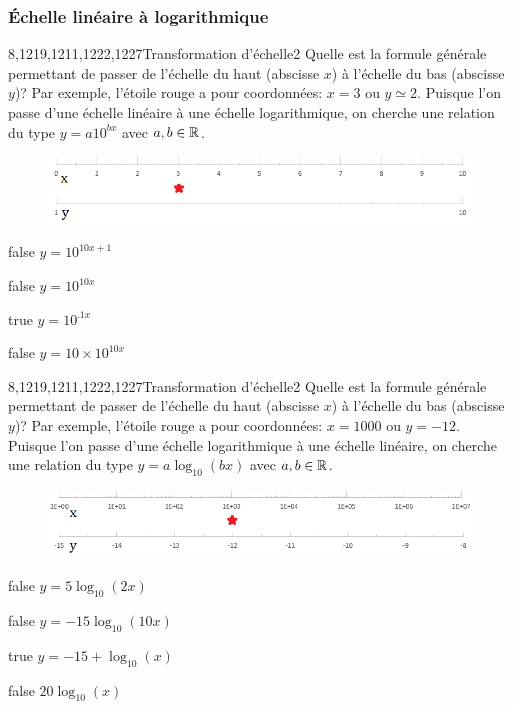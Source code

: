         \subsubsection{Échelle linéaire à logarithmique}
			\begin{question}{8,1219,1211,1222,1227}{Transformation d'échelle}{2}{}
				Quelle est la formule générale permettant de passer de l'échelle du haut (abscisse $x$) à l'échelle du bas (abscisse $y$)? Par exemple, l'étoile rouge a pour coordonnées: $x=\num{3}$ ou $y\simeq\num{2}$. Puisque l'on passe d'une échelle linéaire à une échelle logarithmique, on cherche une relation du type $y = a10^{bx}$ avec $a,b\in\mathbb {R} $.
				\begin{figure}
					\centering
					\includegraphics[scale=.75]{Antoine/Figures_Antoine/lin_1_10_to_log_1_10_star_3_2.png}
				\end{figure}
			\end{question}
			\begin{reponses}
				\item[false] $y = 10^{10x+1}$
				\item[false] $y = 10^{10x}$
				\item[true] $y = 10^{\num{.1}x}$
				\item[false] $y = 10\times 10^{10x}$
			\end{reponses}
			\begin{question}{8,1219,1211,1222,1227}{Transformation d'échelle}{2}{}
				Quelle est la formule générale permettant de passer de l'échelle du haut (abscisse $x$) à l'échelle du bas (abscisse $y$)? Par exemple, l'étoile rouge a pour coordonnées: $x=\num{1000}$ ou $y=\num{-12}$. Puisque l'on passe d'une échelle logarithmique à une échelle linéaire, on cherche une relation du type $y = a\log_{10}(bx)$ avec $a,b\in\mathbb {R} $.
				\begin{figure}
					\centering
					\includegraphics[scale=.75]{Antoine/Figures_Antoine/log_1_1e7_to_lin_-15_-8_star_1e3_-12.png}
				\end{figure}
			\end{question}
			\begin{reponses}
				\item[false] $y = 5\log_{10}(2x)$
				\item[false] $y = -15\log_{10}(10x)$
				\item[true] $y = -15+\log_{10}(x)$
				\item[false] $20\log_{10}(x)$
			\end{reponses}
